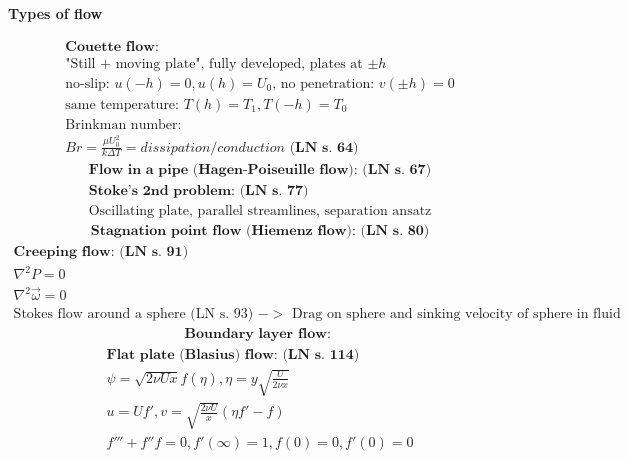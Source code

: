 \documentclass[10pt, a4paper]{article}
\begin{document}
\newpage
\begin{center}
    \Large
    \textbf{Types of flow}
    \vspace{0.5cm}
\end{center}
\begin{gather*}
    \textbf{Couette flow: } \\
    \text{"Still + moving plate", fully developed, plates at $\pm h$} \\
    \text{no-slip: } u(-h) = 0, u(h) = U_0 \text{, no penetration: } v(\pm h) = 0 \\ 
    \text{same temperature: } T(h) = T_1, T(-h) = T_0 \\
    \text{Brinkman number: }\\
    Br = \frac{\mu U_0^2}{k \Delta T} = dissipation/conduction \textbf{ (LN s. 64)}
\end{gather*}
\begin{gather*}
    \textbf{Flow in a pipe (Hagen-Poiseuille flow): (LN s. 67)} 
\end{gather*}
\begin{gather*}
    \textbf{Stoke's 2nd problem: (LN s. 77)} \\
    \text{Oscillating plate, parallel streamlines, separation ansatz} 
\end{gather*}
\begin{gather*}
    \textbf{Stagnation point flow (Hiemenz flow): (LN s. 80)}
\end{gather*}
\begin{gather*}
    \textbf{Creeping flow: (LN s. 91)} \\
    \nabla^2P = 0 \\
    \nabla^2\vec{\omega} = 0 \\
    \text{Stokes flow around a sphere (LN s. 93) $->$ Drag on sphere and sinking velocity of sphere in fluid}
\end{gather*}
\begin{gather*}
    \textbf{Boundary layer flow: }
\end{gather*}
\begin{gather*}
    \textbf{Flat plate (Blasius) flow: (LN s. 114)} \\
    \psi = \sqrt{2\nu U x} f(\eta), \eta = y\sqrt{\frac{U}{2\nu x}} \\
    u = Uf', v = \sqrt{\frac{2\nu U}{x}}(\eta f' - f) \\
    f''' + f''f = 0, f'(\infty) = 1, f(0) = 0, f'(0) = 0
\end{gather*}
\end{document}
